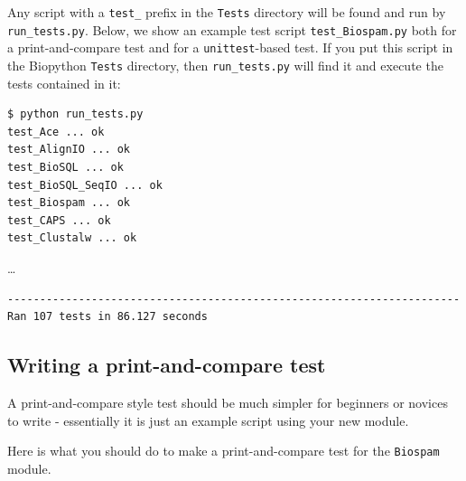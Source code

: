 \documentclass{report}
\begin{document}
Any script with a \verb|test_| prefix in the \verb|Tests| directory will be found and run by \verb|run_tests.py|. Below, we show an example test script \verb|test_Biospam.py| both for a print-and-compare test and for a \verb|unittest|-based test. If you put this script in the Biopython \verb|Tests| directory, then \verb|run_tests.py| will find it and execute the tests contained in it:
\begin{verbatim}
$ python run_tests.py     
test_Ace ... ok
test_AlignIO ... ok
test_BioSQL ... ok
test_BioSQL_SeqIO ... ok
test_Biospam ... ok
test_CAPS ... ok
test_Clustalw ... ok
\end{verbatim}
\ldots
\begin{verbatim}
----------------------------------------------------------------------
Ran 107 tests in 86.127 seconds
\end{verbatim}

\subsection{Writing a print-and-compare test}

A print-and-compare style test should be much simpler for beginners
or novices to write - essentially it is just an example script using
your new module.

Here is what you should do to make a print-and-compare test for the
\verb|Biospam| module.
\end{document}
